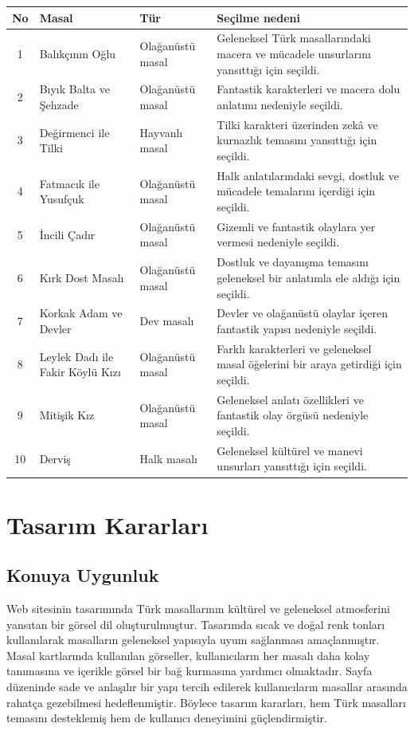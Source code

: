 \documentclass[12pt,a4paper]{article}
\begin{document}
\begin{longtable}{@{}cp{4cm}p{3cm}p{5.4cm}@{}}
\toprule
\textbf{No} & \textbf{Masal} & \textbf{Tür} & \textbf{Seçilme nedeni} \\
\midrule
\endhead
1 & Balıkçının Oğlu & Olağanüstü masal & Geleneksel Türk masallarındaki macera ve mücadele unsurlarını yansıttığı için seçildi. \\
2 & Bıyık Balta ve Şehzade & Olağanüstü masal & Fantastik karakterleri ve macera dolu anlatımı nedeniyle seçildi. \\
3 & Değirmenci ile Tilki & Hayvanlı masal & Tilki karakteri üzerinden zekâ ve kurnazlık temasını yansıttığı için seçildi. \\
4 & Fatmacık ile Yusufçuk & Olağanüstü masal & Halk anlatılarındaki sevgi, dostluk ve mücadele temalarını içerdiği için seçildi. \\
5 & İncili Çadır & Olağanüstü masal & Gizemli ve fantastik olaylara yer vermesi nedeniyle seçildi. \\
6 & Kırk Dost Masalı & Olağanüstü masal & Dostluk ve dayanışma temasını geleneksel bir anlatımla ele aldığı için seçildi. \\
7 & Korkak Adam ve Devler & Dev masalı & Devler ve olağanüstü olaylar içeren fantastik yapısı nedeniyle seçildi. \\
8 & Leylek Dadı ile Fakir Köylü Kızı & Olağanüstü masal & Farklı karakterleri ve geleneksel masal öğelerini bir araya getirdiği için seçildi. \\
9 & Mitişik Kız & Olağanüstü masal & Geleneksel anlatı özellikleri ve fantastik olay örgüsü nedeniyle seçildi. \\
10 & Derviş & Halk masalı & Geleneksel kültürel ve manevi unsurları yansıttığı için seçildi. \\
\bottomrule
\end{longtable}

\section{Tasarım Kararları}


\subsection{Konuya Uygunluk}
Web sitesinin tasarımında Türk masallarının kültürel ve geleneksel atmosferini yansıtan bir görsel dil oluşturulmuştur. Tasarımda sıcak ve doğal renk tonları kullanılarak masalların geleneksel yapısıyla uyum sağlanması amaçlanmıştır. Masal kartlarında kullanılan görseller, kullanıcıların her masalı daha kolay tanımasına ve içerikle görsel bir bağ kurmasına yardımcı olmaktadır. Sayfa düzeninde sade ve anlaşılır bir yapı tercih edilerek kullanıcıların masallar arasında rahatça gezebilmesi hedeflenmiştir. Böylece tasarım kararları, hem Türk masalları temasını desteklemiş hem de kullanıcı deneyimini güçlendirmiştir.
\end{document}
